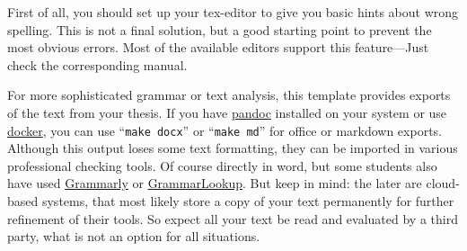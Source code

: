 \documentclass[../main.tex]{subfiles}
\begin{document}
First of all, you should set up your tex-editor to give you basic hints about wrong spelling.
This is not a final solution, but a good starting point to prevent the most obvious errors.
Most of the available editors support this feature---Just check the corresponding manual.

For more sophisticated grammar or text analysis, this template provides exports of the text from your thesis.
If you have \href{https://pandoc.org/}{pandoc} installed on your system or use \href{https://www.docker.com/}{docker}, you can use \enquote{\texttt{make docx}} or \enquote{\texttt{make md}} for office or markdown exports.
Although this output loses some text formatting, they can be imported in various professional checking tools.
Of course directly in word, but some students also have used \href{https://grammarly.com/}{Grammarly} or \href{https://www.grammarlookup.com/}{GrammarLookup}.
But keep in mind: the later are cloud-based systems, that most likely store a copy of your text permanently for further refinement of their tools.
So expect all your text be read and evaluated by a third party, what is not an option for all situations.
\end{document}
